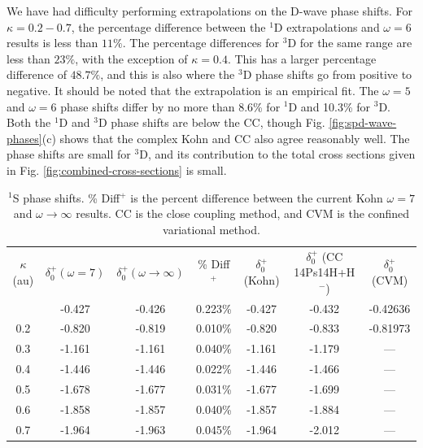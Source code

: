 \documentclass[preprint,showpacs,preprintnumbers,amsmath,amssymb,longbibliography,pra,aps]{revtex4-1}
\begin{document}
We have had difficulty performing extrapolations on the D-wave phase shifts. For $\kappa = 0.2 - 0.7$, the percentage difference between the $^1$D extrapolations and $\omega = 6$ results is less than $11\%$. The percentage differences for $^3$D for the same range are less than $23\%$, with the exception of $\kappa = 0.4$. This has a larger percentage difference of $48.7\%$, and this is also where the $^3$D phase shifts go from positive to negative. It should be noted that the extrapolation is an empirical fit. The $\omega = 5$ and $\omega = 6$ phase shifts differ by no more than 8.6\% for $^1$D and 10.3\% for $^3$D. Both the $^1$D and $^3$D phase shifts are below the CC, though Fig. \ref{fig:spd-wave-phases}(c) shows that the complex Kohn and CC also agree reasonably well. The phase shifts are small for $^3$D, and its contribution to the total cross sections given in Fig. \ref{fig:combined-cross-sections} is small.


\begin{table}[H]
\centering
\begin{ruledtabular}
\begin{tabular}{c c c c c c c}
$\kappa$ (au) & $\delta_0^+ (\omega = 7)$ & $\delta_0^+ (\omega \rightarrow \infty)$ & \% Diff$^+$ & $\delta_0^+$ (Kohn) \cite{VanReeth2003} & $\delta_0^+$ (CC 14Ps14H+H$^-$) \cite{Walters2004} & $\delta_0^+$ (CVM) \cite{Zhang2012} \\
\colrule
0.1 & -0.427 & -0.426 & 0.223\% & -0.427 & -0.432 & -0.42636 \\
0.2 & -0.820 & -0.819 & 0.010\% & -0.820 & -0.833 & -0.81973 \\
0.3 & -1.161 & -1.161 & 0.040\% & -1.161 & -1.179 & --- \\
0.4 & -1.446 & -1.446 & 0.022\% & -1.446 & -1.466 & --- \\
0.5 & -1.678 & -1.677 & 0.031\% & -1.677 & -1.699 & --- \\
0.6 & -1.858 & -1.857 & 0.040\% & -1.857 & -1.884 & --- \\
0.7 & -1.964 & -1.963 & 0.045\% & -1.964 & -2.012 & --- \\
\end{tabular}
\end{ruledtabular}
\caption{$^1$S phase shifts. \% Diff$^+$ is the percent difference between the current Kohn $\omega = 7$ and $\omega \rightarrow \infty$ results. CC is the close coupling method, and CVM is the confined variational method.}
\label{tab:SWaveSingletPhase}
\end{table}
\end{document}
